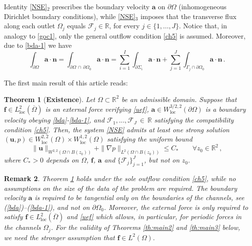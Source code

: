 \documentclass[11pt]{article}
\newtheorem{theorem}{Theorem}[section]
\newtheorem{remark}[theorem]{Remark}
\numberwithin{equation}{section}
\numberwithin{figure}{section}
\newcommand{\R}{\mathbb{R}}
\def\loc{{\mathrm{loc}}}
\def\R{{\mathbb R}}
\def\Fe{{\mathcal F}}
\def\ue{{\mathbf u}}
\def\fe{{\mathbf f}}
\def\n{{\mathbf n}}
\def\ae{{\mathbf a}}
\def\fe{{\mathbf f}}
\begin{document}
Identity \eqref{NSE}$_2$
prescribes the boundary velocity $\ae$ on $\partial \Omega$ (inhomogeneous Dirichlet boundary conditions), while \eqref{NSE}$_3$ imposes that the
transverse flux along each outlet $\Omega_j$ equals $\Fe_j\in\R$, for every $j \in \{1,\dots,J \}$. 
Notice that, in analogy to \eqref{goc1}, only the general outflow condition \eqref{ch5} is assumed. Moreover, due to \eqref{bda-1} we have
\begin{equation} \label{fluxa}
	\int_{\partial\Omega} \ae\cdot\n = \int_{\partial\Omega\, \cap\,\partial \Omega_0} \ae\cdot\n =  \sum_{i=1}^{I} \int_{\partial\Sigma_{i}} \ae\cdot\n  +\sum_{j=1}^{J}  \int_{ \Gamma_{j}\cap \partial\Omega_{0} } \ae\cdot\n  \, .
\end{equation}

The first main result of this article reads:

\begin{theorem}[{\bf Existence}]\label{th:main}
Let $\Omega \subset \mathbb{R}^2$ be an admissible domain. Suppose that $\fe\in L_\loc^{2}(\overline\Omega)$ is an external force verifying
\eqref{uef}, $\ae\in W^{3/2,2}_\loc(\partial\Omega)$ is a boundary velocity obeying \eqref{bda}-\eqref{bda-1}, and $\Fe_1,...,\Fe_J\,{\in}\,\mathbb{R}$
satisfying the compatibility condition \eqref{ch5}. Then, the system \eqref{NSE} admits at least one strong solution
$(\ue,p)\in W^{2,2}_\loc(\Omega)\times W^{1,2}_\loc(\Omega)$ satisfying the uniform bound
\begin{equation}  \label{NSE-est}
\|\ue\|_{W^{2,2}(\Omega\cap B(z_0))}+\|\nabla p\|_{L^2(\Omega\cap B(z_0))}\le C_* \qquad \forall z_0\in\R^2\, ,
\end{equation}
where $C_* > 0$ depends on $\Omega$, $\fe$, $\ae$ and $\{\mathcal{F}_j\}^{J}_{j=1}$, but not on $z_0$.
\end{theorem}

\begin{remark}{\rm 
Theorem \ref{th:main} holds under the sole outflow condition \eqref{ch5}, while no assumptions on the size of the data of the problem are required.
The boundary velocity $\ae$ is required to be tangential only on the boundaries of the channels, see (\ref{bda})--(\ref{bda-1}), and not on $\partial\Omega_0$. Moreover, the external force is only required to satisfy $\fe\in L_\loc^{2}(\overline\Omega)$ and \eqref{uef} which allows, in particular, for periodic forces in the channels $\Omega_j$.
For the validity of Theorems \ref{th:main2} and \ref{th:main3} below, we need the stronger assumption that $\fe\in L^{2}(\Omega)$.}
\end{remark}
\end{document}
